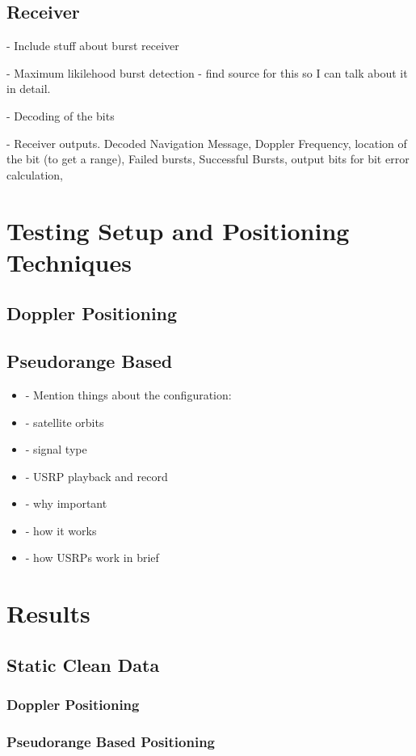 \documentclass[12pt]{report}
\begin{document}
\section{Receiver}
- Include stuff about burst receiver

- Maximum likilehood burst detection
    - find source for this so I can talk about it in detail.

- Decoding of the bits

- Receiver outputs. Decoded Navigation Message, Doppler Frequency, location of the bit (to get a range), Failed bursts, Successful Bursts, output bits for bit error calculation,

\chapter{Testing Setup and Positioning Techniques}
\section{Doppler Positioning}
\section{Pseudorange Based}
\begin{itemize}
    \item     - Mention things about the configuration:
    \item     - satellite orbits
    \item     - signal type
    \item     - USRP playback and record
    \item     - why important
    \item     - how it works
    \item     - how USRPs work in brief


\end{itemize}


\chapter{Results}
\section{Static Clean Data}
\subsection{Doppler Positioning}
\subsection{Pseudorange Based Positioning}
\end{document}
